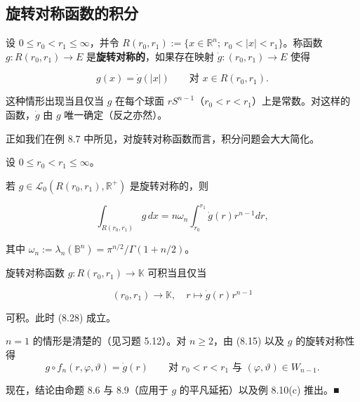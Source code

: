 \subsection*{旋转对称函数的积分}

设 $ 0 \le r_{0} < r_{1} \le \infty $，并令 $ R(r_{0}, r_{1}) := \{ x \in \mathbb{R}^{n} ;\ r_{0} < |x| < r_{1} \} $。称函数 $ g: R(r_{0}, r_{1}) \to E $ 是\textbf{旋转对称的}，如果存在映射 $ \dot{g}: (r_{0}, r_{1}) \to E $ 使得

\[
g(x) = \dot{g}(|x|) \qquad \text{对 } x \in R(r_{0}, r_{1}).
\]

这种情形出现当且仅当 $ g $ 在每个球面 $ rS^{n-1} $（$ r_{0} < r < r_{1} $）上是常数。对这样的函数，$ \dot{g} $ 由 $ g $ 唯一确定（反之亦然）。

正如我们在例 8.7 中所见，对旋转对称函数而言，积分问题会大大简化。

\begin{theorem}

设 $ 0 \le r_{0} < r_{1} \le \infty $。

\begin{subitems}
\item

若 $ g \in \mathcal{L}_{0}(R(r_{0}, r_{1}), \mathbb{R}^{+}) $ 是旋转对称的，则

\begin{equation}
\int_{R(r_{0}, r_{1})} g\,dx = n\omega_{n}\int_{r_{0}}^{r_{1}} \dot{g}(r)r^{n-1}dr,\tag{8.28}
\end{equation}

其中 $ \omega_{n} := \lambda_{n}(\mathbb{B}^{n}) = \pi^{n/2}/\Gamma(1 + n/2) $。

\item

旋转对称函数 $ g: R(r_{0}, r_{1}) \to \mathbb{K} $ 可积当且仅当

\[
(r_{0}, r_{1}) \to \mathbb{K}, \quad r \mapsto \dot{g}(r)r^{n-1}
\]

可积。此时 (8.28) 成立。

\proofhead
$ n = 1 $ 的情形是清楚的（见习题 5.12）。对 $ n \ge 2 $，由 (8.15) 以及 $ g $ 的旋转对称性得
\[
g\circ f_{n}(r, \varphi, \vartheta) = \dot{g}(r) \qquad \text{对 } r_{0} < r < r_{1} \text{ 与 } (\varphi, \vartheta) \in W_{n-1}.
\]

现在，结论由命题 8.6 与 8.9（应用于 $ g $ 的平凡延拓）以及例 8.10(c) 推出。\nobreak\hspace{0.35em}■

\end{subitems}

\end{theorem}

